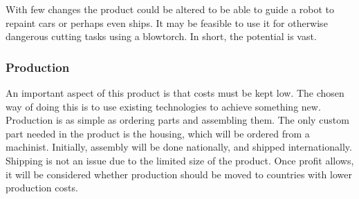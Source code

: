 With few changes the product could be altered to be able to guide a robot to repaint cars or perhaps even ships. It may be feasible to use it for otherwise dangerous cutting tasks using a blowtorch. In short, the potential is vast.

\subsubsection{Production}
An important aspect of this product is that costs must be kept low. The chosen way of doing this is to use existing technologies to achieve something new. Production is as simple as ordering parts and assembling them. The only custom part needed in the product is the housing, which will be ordered from a machinist. Initially, assembly will be done nationally, and shipped internationally. Shipping is not an issue due to the limited size of the product. Once profit allows, it will be considered whether production should be moved to countries with lower production costs.
